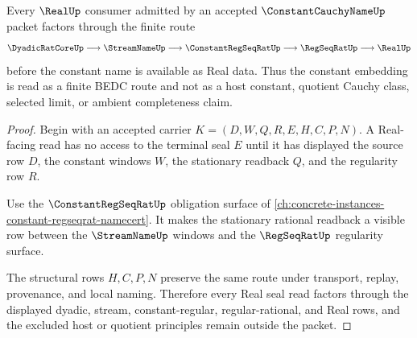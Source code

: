 \begin{theorem}
\label{thm:constant-cauchy-name-real-seal}
Every $\RealUp$ consumer admitted by an accepted $\ConstantCauchyNameUp$ packet factors through the finite route
$$
\DyadicRatCoreUp \longrightarrow \StreamNameUp \longrightarrow \ConstantRegSeqRatUp \longrightarrow \RegSeqRatUp \longrightarrow \RealUp
$$
before the constant name is available as Real data. Thus the constant embedding is read as a finite BEDC route and not as a host constant, quotient Cauchy class, selected limit, or ambient completeness claim.
\end{theorem}
\begin{proof}
Begin with an accepted carrier $K=(D,W,Q,R,E,H,C,P,N)$. A Real-facing read has no access to the terminal seal $E$ until it has displayed the source row $D$, the constant windows $W$, the stationary readback $Q$, and the regularity row $R$.

Use the $\ConstantRegSeqRatUp$ obligation surface of \autoref{ch:concrete-instances-constant-regseqrat-namecert}. It makes the stationary rational readback a visible row between the $\StreamNameUp$ windows and the $\RegSeqRatUp$ regularity surface.

The structural rows $H,C,P,N$ preserve the same route under transport, replay, provenance, and local naming. Therefore every Real seal read factors through the displayed dyadic, stream, constant-regular, regular-rational, and Real rows, and the excluded host or quotient principles remain outside the packet.
\end{proof}

